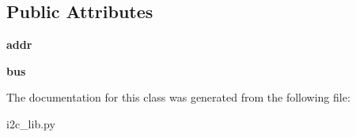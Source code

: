 \subsection*{Public Attributes}
\begin{DoxyCompactItemize}
\item 
\hypertarget{classi2c__lib_1_1i2c__device_acbed464b8784c5af0ad0cd7c67eee5cf}{}{\bfseries addr}\label{classi2c__lib_1_1i2c__device_acbed464b8784c5af0ad0cd7c67eee5cf}

\item 
\hypertarget{classi2c__lib_1_1i2c__device_a56a3b7c2a48700d69faff94e0af39a93}{}{\bfseries bus}\label{classi2c__lib_1_1i2c__device_a56a3b7c2a48700d69faff94e0af39a93}

\end{DoxyCompactItemize}


The documentation for this class was generated from the following file\+:\begin{DoxyCompactItemize}
\item 
i2c\+\_\+lib.\+py\end{DoxyCompactItemize}
